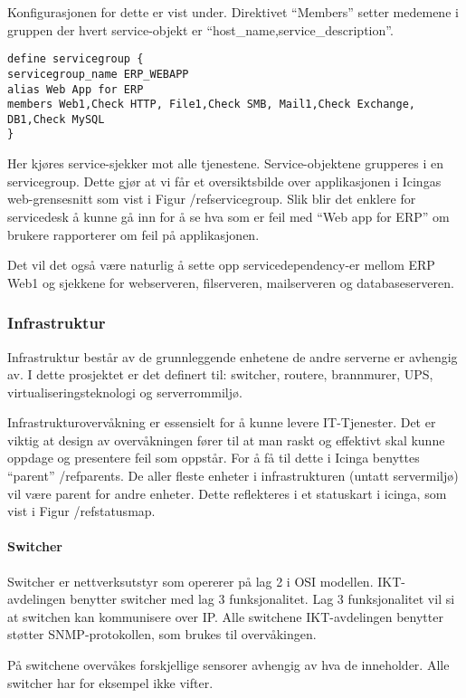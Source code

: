 Konfigurasjonen for dette er vist under. Direktivet “Members” setter medemene i gruppen der hvert service-objekt er “host\_name,service\_description”.

\begin{lstlisting}
define servicegroup {
servicegroup_name ERP_WEBAPP
alias Web App for ERP
members Web1,Check HTTP, File1,Check SMB, Mail1,Check Exchange, DB1,Check MySQL
}
\end{lstlisting}


Her kjøres service-sjekker mot alle tjenestene. Service-objektene grupperes i en servicegroup. 
Dette gjør at vi får et oversiktsbilde over applikasjonen i Icingas web-grensesnitt som vist i Figur /ref{servicegroup}. Slik blir det enklere for servicedesk å kunne gå inn for å se hva som er feil med “Web app for ERP” om brukere rapporterer om feil på applikasjonen.

Det vil det også være naturlig å sette opp servicedependency-er mellom ERP Web1 og sjekkene for webserveren, filserveren, mailserveren og databaseserveren.

\subsubsection{Infrastruktur}
Infrastruktur består av de grunnleggende enhetene de andre serverne er avhengig av. I dette prosjektet er det definert til: switcher, routere, brannmurer, UPS, virtualiseringsteknologi og serverrommiljø.

Infrastrukturovervåkning er essensielt for å kunne levere IT-Tjenester. Det er viktig at design av overvåkningen fører til at man raskt og effektivt skal kunne oppdage og presentere feil som oppstår. For å få til dette i Icinga benyttes “parent” /ref{parents}. De aller fleste enheter i infrastrukturen (untatt servermiljø) vil være parent for andre enheter. Dette reflekteres i et statuskart i icinga, som vist i Figur /ref{statusmap}.

\paragraph{Switcher}
Switcher er nettverksutstyr som opererer på lag 2 i OSI modellen. IKT-avdelingen benytter switcher med lag 3 funksjonalitet. Lag 3 funksjonalitet vil si at switchen kan kommunisere over IP. Alle switchene IKT-avdelingen benytter støtter SNMP-protokollen, som brukes til overvåkingen.

På switchene overvåkes forskjellige sensorer avhengig av hva de inneholder. Alle switcher har for eksempel ikke vifter.

